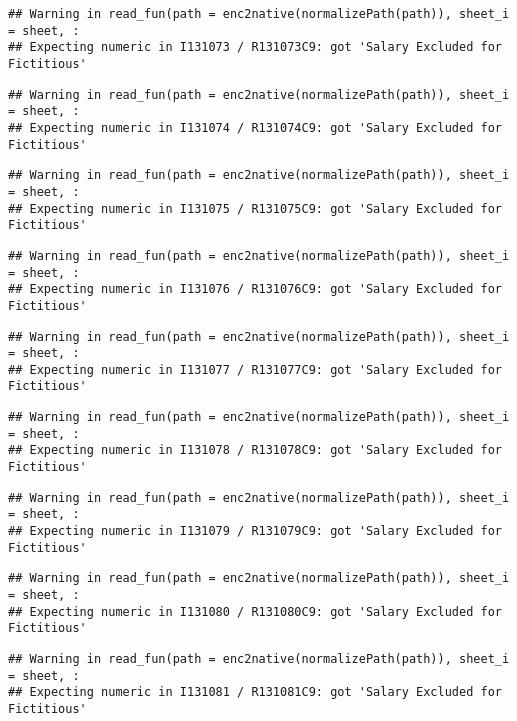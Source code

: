 \documentclass[
]{article}
\begin{document}
\begin{verbatim}
## Warning in read_fun(path = enc2native(normalizePath(path)), sheet_i = sheet, :
## Expecting numeric in I131073 / R131073C9: got 'Salary Excluded for Fictitious'
\end{verbatim}

\begin{verbatim}
## Warning in read_fun(path = enc2native(normalizePath(path)), sheet_i = sheet, :
## Expecting numeric in I131074 / R131074C9: got 'Salary Excluded for Fictitious'
\end{verbatim}

\begin{verbatim}
## Warning in read_fun(path = enc2native(normalizePath(path)), sheet_i = sheet, :
## Expecting numeric in I131075 / R131075C9: got 'Salary Excluded for Fictitious'
\end{verbatim}

\begin{verbatim}
## Warning in read_fun(path = enc2native(normalizePath(path)), sheet_i = sheet, :
## Expecting numeric in I131076 / R131076C9: got 'Salary Excluded for Fictitious'
\end{verbatim}

\begin{verbatim}
## Warning in read_fun(path = enc2native(normalizePath(path)), sheet_i = sheet, :
## Expecting numeric in I131077 / R131077C9: got 'Salary Excluded for Fictitious'
\end{verbatim}

\begin{verbatim}
## Warning in read_fun(path = enc2native(normalizePath(path)), sheet_i = sheet, :
## Expecting numeric in I131078 / R131078C9: got 'Salary Excluded for Fictitious'
\end{verbatim}

\begin{verbatim}
## Warning in read_fun(path = enc2native(normalizePath(path)), sheet_i = sheet, :
## Expecting numeric in I131079 / R131079C9: got 'Salary Excluded for Fictitious'
\end{verbatim}

\begin{verbatim}
## Warning in read_fun(path = enc2native(normalizePath(path)), sheet_i = sheet, :
## Expecting numeric in I131080 / R131080C9: got 'Salary Excluded for Fictitious'
\end{verbatim}

\begin{verbatim}
## Warning in read_fun(path = enc2native(normalizePath(path)), sheet_i = sheet, :
## Expecting numeric in I131081 / R131081C9: got 'Salary Excluded for Fictitious'
\end{verbatim}
\end{document}
